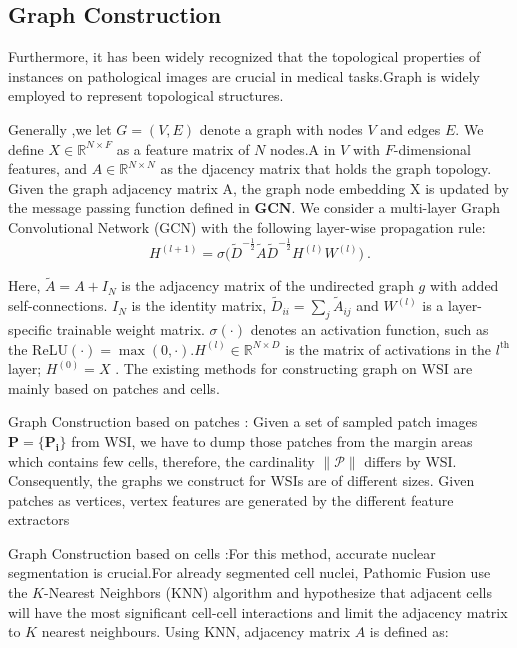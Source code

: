 \documentclass[journal,twoside,web]{ieeecolor}
\begin{document}
\subsection{Graph Construction}

Furthermore, it has been widely recognized that the topological properties of instances on pathological images are crucial in medical tasks.Graph is widely employed to represent topological structures.

Generally ,we let $G=(V,E)$ denote a graph with nodes $V$ and edges $E.$ We define $X\in\mathbb{R}^{N\times F}$ as a feature matrix of $N$ nodes.A in $V$ with $F$-dimensional features, and $A\in\mathbb{R}^{N\times N}$ as the djacency matrix that holds the graph topology. 
Given the graph adjacency matrix A, the graph node embedding X is updated by the message passing function defined in $\mathbf{GCN}$. We consider a multi-layer Graph Convolutional Network (GCN) with the following layer-wise propagation rule\cite{kipf2016semi}:
\begin{equation}\label{GCN-1}
H^{(l+1)}=\sigma\Big(\tilde{D}^{-\frac12}\tilde{A}\tilde{D}^{-\frac12}H^{(l)}W^{(l)}\Big)\:.
\end{equation}

Here, $\tilde{A}=A+I_N$ is the adjacency matrix of the undirected graph $g$ with added self-connections. $I_N$ is the identity matrix, $\tilde{D} _{ii}= \sum _j\tilde{A} _{ij}$ and $W^{( l) }$ is a layer-specific trainable weight matrix. $\sigma(\cdot)$ denotes an activation function, such as the ReLU$( \cdot ) = \max ( 0, \cdot ) .H^{( l) }\in \mathbb{R} ^{N\times D}$ is the matrix of activations in the $l^\mathrm{th}$ layer; $H^{(0)}=X$ . The existing methods for constructing graph on WSI are mainly based on patches and cells.

Graph Construction based on patches : Given a set of sampled patch images $\mathbf{P}=\{\mathbf{P_i}\}$ from WSI, we have to dump those patches from the margin areas which contains few cells, therefore, the cardinality $\|\mathcal{P}\|$ differs by WSI. Consequently, the graphs we construct for WSIs are of different sizes. Given patches as vertices, vertex features are generated by the different feature extractors


Graph Construction based on cells :For this method, accurate nuclear segmentation is crucial.For already segmented cell nuclei, Pathomic Fusion\cite{chen2020pathomic} use the $K$-Nearest Neighbors (KNN) algorithm and hypothesize that adjacent cells will have the most significant cell-cell interactions and limit the adjacency matrix to $K$ nearest neighbours. Using KNN, adjacency matrix $A$ is defined as: 
\end{document}
